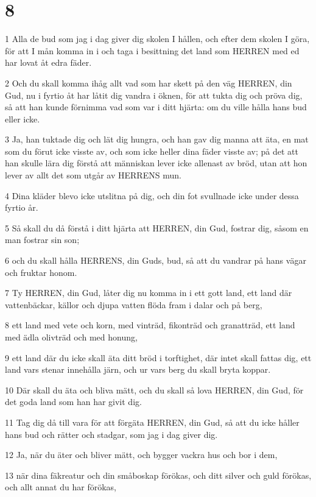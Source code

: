 \chapter{8}

\par 1 Alla de bud som jag i dag giver dig skolen I hållen, och efter dem skolen I göra, för att I mån komma in i och taga i besittning det land som HERREN med ed har lovat åt edra fäder.
\par 2 Och du skall komma ihåg allt vad som har skett på den väg HERREN, din Gud, nu i fyrtio åt har låtit dig vandra i öknen, för att tukta dig och pröva dig, så att han kunde förnimma vad som var i ditt hjärta: om du ville hålla hans bud eller icke.
\par 3 Ja, han tuktade dig och lät dig hungra, och han gav dig manna att äta, en mat som du förut icke visste av, och som icke heller dina fäder visste av; på det att han skulle lära dig förstå att människan lever icke allenast av bröd, utan att hon lever av allt det som utgår av HERRENS mun.
\par 4 Dina kläder blevo icke utslitna på dig, och din fot svullnade icke under dessa fyrtio år.
\par 5 Så skall du då förstå i ditt hjärta att HERREN, din Gud, fostrar dig, såsom en man fostrar sin son;
\par 6 och du skall hålla HERRENS, din Guds, bud, så att du vandrar på hans vägar och fruktar honom.
\par 7 Ty HERREN, din Gud, låter dig nu komma in i ett gott land, ett land där vattenbäckar, källor och djupa vatten flöda fram i dalar och på berg,
\par 8 ett land med vete och korn, med vinträd, fikonträd och granatträd, ett land med ädla olivträd och med honung,
\par 9 ett land där du icke skall äta ditt bröd i torftighet, där intet skall fattas dig, ett land vars stenar innehålla järn, och ur vars berg du skall bryta koppar.
\par 10 Där skall du äta och bliva mätt, och du skall så lova HERREN, din Gud, för det goda land som han har givit dig.
\par 11 Tag dig då till vara för att förgäta HERREN, din Gud, så att du icke håller hans bud och rätter och stadgar, som jag i dag giver dig.
\par 12 Ja, när du äter och bliver mätt, och bygger vackra hus och bor i dem,
\par 13 när dina fäkreatur och din småboskap förökas, och ditt silver och guld förökas, och allt annat du har förökas,
